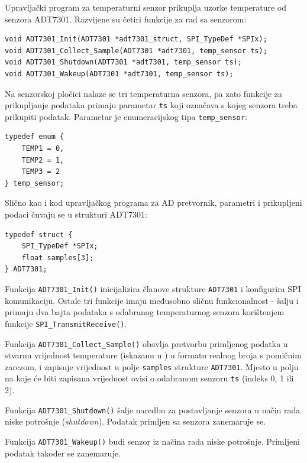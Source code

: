 Upravljački program za temperaturni senzor prikuplja uzorke temperature od senzora ADT7301. Razvijene su četiri funkcije za rad sa senzorom:

\begin{lstlisting}[caption={Funkcije upravljačkog programa za sklop ADT7301}]
void ADT7301_Init(ADT7301 *adt7301_struct, SPI_TypeDef *SPIx);
void ADT7301_Collect_Sample(ADT7301 *adt7301, temp_sensor ts);
void ADT7301_Shutdown(ADT7301 *adt7301, temp_sensor ts);
void ADT7301_Wakeup(ADT7301 *adt7301, temp_sensor ts);
\end{lstlisting}

Na senzorskoj pločici nalaze se tri temperaturna senzora, pa zato funkcije za prikupljanje podataka primaju parametar \texttt{ts} koji označava s kojeg senzora treba prikupiti podatak. Parametar je enumeracijskog tipa \texttt{temp\_sensor}:

\begin{lstlisting}[caption={Definicija tipa \texttt{temp\_sensor}}]
typedef enum {
    TEMP1 = 0,
    TEMP2 = 1,
    TEMP3 = 2
} temp_sensor;
\end{lstlisting}

Slično kao i kod upravljačkog programa za AD pretvornik, parametri i prikupljeni podaci čuvaju se u strukturi ADT7301:

\begin{lstlisting}[caption={Definicija tipa \texttt{ADT7301}}]
typedef struct {
	SPI_TypeDef *SPIx;
	float samples[3];
} ADT7301;
\end{lstlisting}

Funkcija \texttt{ADT7301\_Init()} inicijalizira članove strukture \texttt{ADT7301} i konfigurira SPI komunikaciju. Ostale tri funkcije imaju međusobno sličnu funkcionalnost - šalju i primaju dva bajta podataka s odabranog temperaturnog senzora korištenjem funkcije \texttt{SPI\_TransmitReceive()}. 

Funkcija \texttt{ADT7301\_Collect\_Sample()} obavlja pretvorbu primljenog podatka u stvarnu vrijednost temperature (iskazanu u \textcelsius{}) u formatu realnog broja s pomičnim zarezom, i zapisuje vrijednost u polje \texttt{samples} strukture \texttt{ADT7301}. Mjesto u polju na koje će biti zapisana vrijednost ovisi o odabranom senzoru \texttt{ts} (indeks 0, 1 ili 2).

Funkcija \texttt{ADT7301\_Shutdown()} šalje naredbu za postavljanje senzora u način rada niske potrošnje (\textit{shutdown}). Podatak primljen sa senzora zanemaruje se.

Funkcija \texttt{ADT7301\_Wakeup()} \glqq{}budi\grqq{} senzor iz načina rada niske potrošnje. Primljeni podatak također se zanemaruje.

